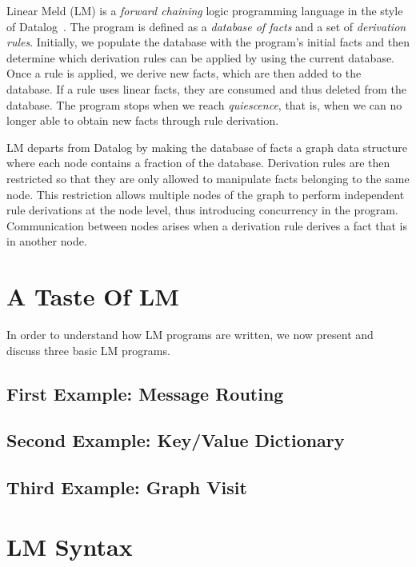 
Linear Meld (LM) is a \emph{forward chaining} logic programming language in the
style of Datalog~\cite{Ullman:1990:PDK:533142}. The program is defined as a
\emph{database of facts} and a set of \emph{derivation rules}.  Initially, we
populate the database with the program's initial facts and then determine which
derivation rules can be applied by using the current database. Once a rule is
applied, we derive new facts, which are then added to the database.  If a rule
uses linear facts, they are consumed and thus deleted from the database.  The
program stops when we reach \emph{quiescence}, that is, when we can no longer
able to obtain new facts through rule derivation.

LM departs from Datalog by making the database of facts a graph data structure
where each node contains a fraction of the database. Derivation rules are then
restricted so that they are only allowed to manipulate facts belonging to the
same node. This restriction allows multiple nodes of the graph to perform
independent rule derivations at the node level, thus introducing concurrency in
the program. Communication between nodes arises when a derivation rule derives a
fact that is in another node.

\section{A Taste Of LM}

In order to understand how LM programs are written, we now present and discuss
three basic LM programs.

\subsection{First Example: Message Routing}


\subsection{Second Example: Key/Value Dictionary}\label{sec:language:key_value}


\subsection{Third Example: Graph Visit}


\section{LM Syntax}

